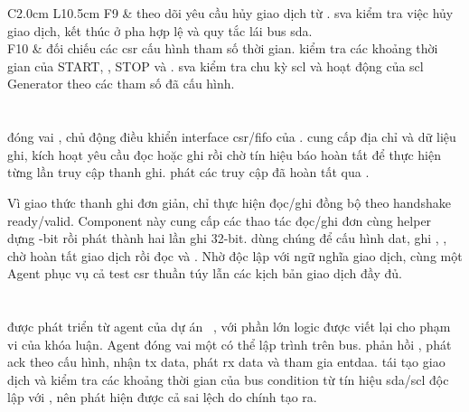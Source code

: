 \begin{table}[!htbp]
\begin{tabular}{C{2.0cm} L{10.5cm}}
		F9               & \Scoreboard{} theo dõi yêu cầu hủy giao dịch từ \Host{}. \Gls{sva} kiểm tra việc hủy giao dịch, kết thúc ở pha hợp lệ và quy tắc lái bus \gls{sda}.                                                                                                                                     \\
		F10              & \RegisterMonitor{} đối chiếu các \gls{csr} cấu hình tham số thời gian. \IThreeCMonitor{} kiểm tra các khoảng thời gian của START, \RepeatedSTART{}, STOP và \BusFreeCondition{}. \Gls{sva} kiểm tra chu kỳ \gls{scl} và hoạt động của \gls{scl} Generator theo các tham số đã cấu hình. \\
		\bottomrule
	\end{tabular}
\end{table}

\section{\RegisterAgent{}}
\label{sec:ver-regagent}

\RegisterAgent{} đóng vai \Host{}, chủ động điều khiển interface \gls{csr}/\gls{fifo} của \Controller{}.
\RegisterDriver{} cung cấp địa chỉ và dữ liệu ghi, kích hoạt yêu cầu đọc hoặc ghi rồi chờ tín hiệu
báo hoàn tất để thực hiện từng lần truy cập thanh ghi. \RegisterMonitor{} phát các truy cập đã hoàn
tất qua \TLMAnalysisPort{}.

Vì giao thức thanh ghi đơn giản, \RegisterDriver{} chỉ thực hiện đọc/ghi đồng bộ theo handshake
ready/valid.
Component này cung cấp các thao tác đọc/ghi đơn cùng helper dựng \CommandDescriptor{}
\CommandDescriptorWidth{}-bit rồi phát thành hai lần ghi 32-bit. \VirtualSequence{} dùng chúng
để cấu hình \gls{dat}, ghi \TxFifo{}, \CommandFifo{}, chờ \Controller{} hoàn tất giao dịch rồi
đọc \RxFifo{} và \ResponseFifo{}.
Nhờ \RegisterDriver{} độc lập với ngữ nghĩa giao dịch, cùng một Agent phục vụ cả test \gls{csr}
thuần túy lẫn các kịch bản giao dịch đầy đủ.

\section{\IThreeCAgent{}}
\label{sec:ver-i3cagent}

\IThreeCAgent{} được phát triển từ agent của dự án \CHIPSAlliance{} \IThreeCCore{}~\cite{chipsalliance_i3c}, với phần lớn logic được viết lại cho phạm vi của khóa luận. Agent đóng vai một \Target{} có thể lập trình trên bus. \IThreeCDriver{} phản hồi
\AddressHeader{}, phát \gls{ack} theo cấu hình, nhận \gls{tx} data, phát \gls{rx} data và tham
gia \gls{entdaa}. \IThreeCMonitor{} tái tạo giao dịch và kiểm tra các khoảng thời gian của bus condition từ tín hiệu \gls{sda}/\gls{scl} độc lập với \IThreeCDriver{}, nên phát hiện
được cả sai lệch do chính \IThreeCDriver{} tạo ra.

